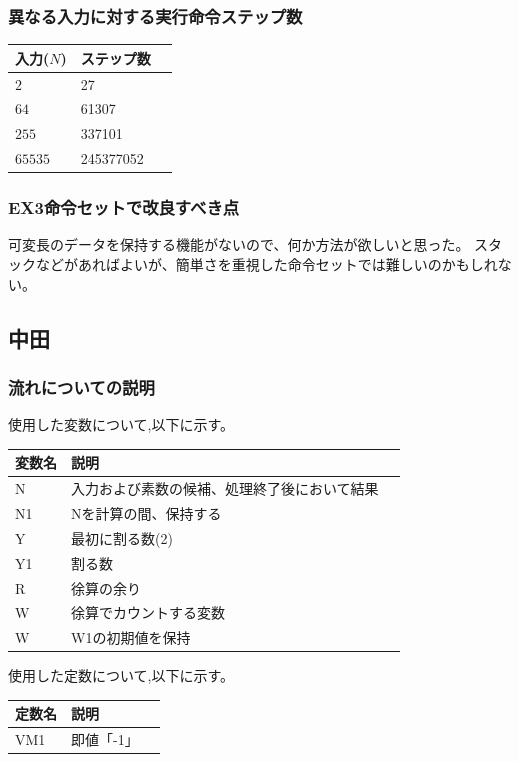 \documentclass[dvipdfmx,12pt]{jreport}
\begin{document}
\subsubsection{異なる入力に対する実行命令ステップ数}
\begin{table}[h]
  \begin{tabular}{|l|l|l|} \hline
    入力($N$) & ステップ数 \\ \hline
    $2$ & 27 \\ \hline
    $64$ & 61307 \\ \hline
    $255$ & 337101 \\ \hline
    $65535$ & 245377052 \\ \hline
  \end{tabular}
\end{table}

\subsubsection{EX3命令セットで改良すべき点}
可変長のデータを保持する機能がないので、何か方法が欲しいと思った。
スタックなどがあればよいが、簡単さを重視した命令セットでは難しいのかもしれない。

\subsection*{中田}
\subsubsection*{流れについての説明}
使用した変数について,以下に示す。
\begin{table}[h]
  \begin{tabular}{|l|l|l|} \hline
    変数名 & 説明 \\ \hline
    N & 入力および素数の候補、処理終了後において結果 \\ \hline
    N1 & Nを計算の間、保持する \\ \hline
    Y & 最初に割る数(2) \\ \hline
    Y1 & 割る数 \\ \hline
    R & 徐算の余り \\ \hline
    W & 徐算でカウントする変数 \\ \hline
    W & W1の初期値を保持 \\ \hline
  \end{tabular}
\end{table}
使用した定数について,以下に示す。
\begin{table}[h]
  \begin{tabular}{|l|l|l|} \hline
    定数名 & 説明 \\ \hline
    VM1 & 即値「-1」 \\ \hline
  \end{tabular}
\end{table}
\end{document}
